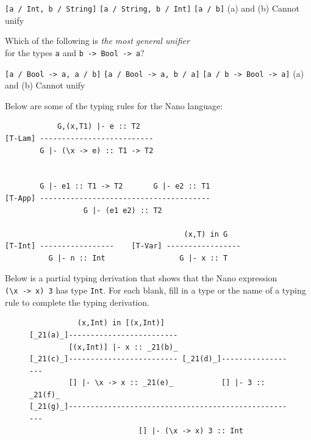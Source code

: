 \documentclass[addpoints]{exam}
\begin{document}
\begin{questions}
\begin{choices}
  \choice \texttt{[a / Int, b / String]}
  \CorrectChoice \texttt{[a / String, b / Int]}
  \choice \texttt{[a / b]}
  \choice (a) and (b)
  \choice Cannot unify
\end{choices}

\question[5] Which of the following is \emph{the most general unifier} \\ for the types \texttt{a} and \texttt{b -> Bool -> a}?

\begin{choices}
  \choice \texttt{[a / Bool -> a, a / b]}
  \choice \texttt{[a / Bool -> a, b / a]}
  \choice \texttt{[a / b -> Bool -> a]}
  \choice (a) and (b)
  \CorrectChoice Cannot unify
\end{choices}

\question Below are some of the typing rules for the Nano language:

\begin{verbatim}
            G,(x,T1) |- e :: T2   
[T-Lam] --------------------------
        G |- (\x -> e) :: T1 -> T2


        G |- e1 :: T1 -> T2       G |- e2 :: T1  
[T-App] ---------------------------------------
                  G |- (e1 e2) :: T2

                                         (x,T) in G    
[T-Int] -----------------    [T-Var] -----------------
          G |- n :: Int                 G |- x :: T
\end{verbatim}

Below is a partial typing derivation that shows that the Nano expression \\
\verb|(\x -> x) 3| has type \texttt{Int}.  For each blank, fill in a type or the name of a typing rule to complete the typing derivation.

\begin{figure}[h]
\advance\leftskip-12cm
\begin{verbatim}
           (x,Int) in [(x,Int)]
[_21(a)_]-------------------------
         [(x,Int)] |- x :: _21(b)_
[_21(c)_]------------------------- [_21(d)_]------------------
         [] |- \x -> x :: _21(e)_           [] |- 3 :: _21(f)_
[_21(g)_]-----------------------------------------------------
                         [] |- (\x -> x) 3 :: Int
\end{verbatim}
\end{figure}

\end{questions}
\end{document}
